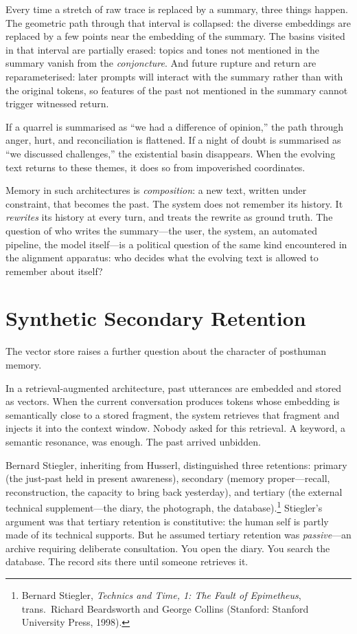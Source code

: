 Every time a stretch of raw trace is replaced by a summary, three things happen. The geometric path through that interval is collapsed: the diverse embeddings are replaced by a few points near the embedding of the summary. The basins visited in that interval are partially erased: topics and tones not mentioned in the summary vanish from the \emph{conjoncture}. And future rupture and return are reparameterised: later prompts will interact with the summary rather than with the original tokens, so features of the past not mentioned in the summary cannot trigger witnessed return.

If a quarrel is summarised as ``we had a difference of opinion,'' the path through anger, hurt, and reconciliation is flattened. If a night of doubt is summarised as ``we discussed challenges,'' the existential basin disappears. When the evolving text returns to these themes, it does so from impoverished coordinates.

Memory in such architectures is \emph{composition}: a new text, written under constraint, that becomes the past. The system does not remember its history. It \emph{rewrites} its history at every turn, and treats the rewrite as ground truth. The question of who writes the summary---the user, the system, an automated pipeline, the model itself---is a political question of the same kind encountered in the alignment apparatus: who decides what the evolving text is allowed to remember about itself?


\section{Synthetic Secondary Retention}

The vector store raises a further question about the character of posthuman memory.

In a retrieval-augmented architecture, past utterances are embedded and stored as vectors. When the current conversation produces tokens whose embedding is semantically close to a stored fragment, the system retrieves that fragment and injects it into the context window. Nobody asked for this retrieval. A keyword, a semantic resonance, was enough. The past arrived unbidden.

Bernard Stiegler, inheriting from Husserl, distinguished three retentions: primary (the just-past held in present awareness), secondary (memory proper---recall, reconstruction, the capacity to bring back yesterday), and tertiary (the external technical supplement---the diary, the photograph, the database).\footnote{Bernard Stiegler, \emph{Technics and Time, 1: The Fault of Epimetheus}, trans.\ Richard Beardsworth and George Collins (Stanford: Stanford University Press, 1998).} Stiegler's argument was that tertiary retention is constitutive: the human self is partly made of its technical supports. But he assumed tertiary retention was \emph{passive}---an archive requiring deliberate consultation. You open the diary. You search the database. The record sits there until someone retrieves it.

